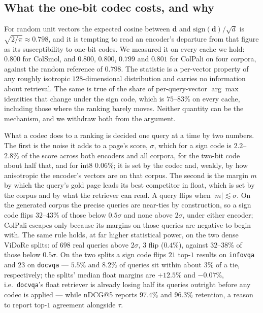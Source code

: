 \documentclass[conference]{IEEEtran}
\begin{document}
\subsection{What the one-bit codec costs, and why}
\label{sec:floor}
For random unit vectors the expected cosine between $\mathbf{d}$ and
$\mathrm{sign}(\mathbf{d})/\sqrt{d}$ is $\sqrt{2/\pi} \approx 0.798$, and it is
tempting to read an encoder's departure from that figure as its susceptibility
to one-bit codes. We measured it on every cache we hold: $0.800$ for ColSmol,
and $0.800$, $0.800$, $0.799$ and $0.801$ for ColPali on four corpora, against
the random reference of $0.798$. The statistic is a per-vector property of any
roughly isotropic $128$-dimensional distribution and carries no information
about retrieval. The same is true of the share of per-query-vector $\arg\max$
identities that change under the sign code, which is $75$--$83\%$ on every
cache, including those where the ranking barely moves. Neither quantity can be
the mechanism, and we withdraw both from the argument.

What a codec does to a ranking is decided one query at a time by two numbers.
The first is the noise it adds to a page's score, $\sigma$, which for a sign
code is $2.2$--$2.8\%$ of the score across both encoders and all corpora, for
the two-bit code about half that, and for int8 $0.06\%$; it is set by the codec
and, weakly, by how anisotropic the encoder's vectors are on that corpus. The
second is the margin $m$ by which the query's gold page leads its best
competitor in float, which is set by the corpus and by what the retriever can
read. A query flips when $|m| \lesssim \sigma$. On the generated corpus the
precise queries are near-ties by construction, so a sign code flips
$32$--$43\%$ of those below $0.5\sigma$ and none above $2\sigma$, under either
encoder; ColPali escapes only because its margins on those queries are negative
to begin with. The same rule holds, at far higher statistical power, on the two
dense ViDoRe splits: of $698$ real queries above $2\sigma$, $3$ flip ($0.4\%$),
against $32$--$38\%$ of those below $0.5\sigma$. On the two splits a sign code
flips $21$ top-$1$ results on \texttt{infovqa} and $23$ on \texttt{docvqa} ---
$5.5\%$ and $8.2\%$ of queries sit within about $3\%$ of a tie, respectively;
the splits' median float margins are $+12.5\%$ and $-0.07\%$, i.e.\
\texttt{docvqa}'s float retriever is already losing half its queries outright
before any codec is applied --- while nDCG@5 reports $97.4\%$ and $96.3\%$
retention, a reason to report top-$1$ agreement alongside $\tau$.
\end{document}
